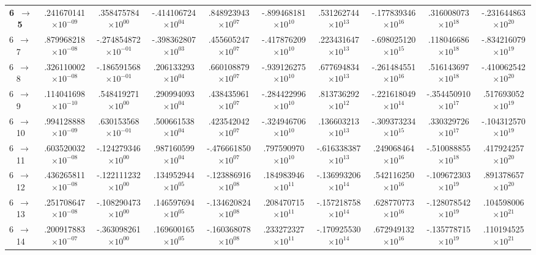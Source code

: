 \documentclass[reviewcopy]{elsarticle}
\begin{document}
\begin{landscape}
\begin{longtable}{lccccccccc}
{\bf 6~$\to$~ 5}  &  .241670141$\times10^{-09}$ &  .358475784$\times10^{00}$ & -.414106724$\times10^{04}$ &  .848923943$\times10^{07}$ & -.899468181$\times10^{10}$ &  .531262744$\times10^{13}$ & -.177839346$\times10^{16}$ &  .316008073$\times10^{18}$ & -.231644863$\times10^{20}$ \\
 6~$\to$~ 7  &  .879968218$\times10^{-08}$ & -.274854872$\times10^{-01}$ & -.398362807$\times10^{03}$ &  .455605247$\times10^{07}$ & -.417876209$\times10^{10}$ &  .223431647$\times10^{13}$ & -.698025120$\times10^{15}$ &  .118046686$\times10^{18}$ & -.834216079$\times10^{19}$ \\
 6~$\to$~ 8  &  .326110002$\times10^{-08}$ & -.186591568$\times10^{-01}$ &  .206133293$\times10^{04}$ &  .660108879$\times10^{07}$ & -.939126275$\times10^{10}$ &  .677694834$\times10^{13}$ & -.261484551$\times10^{16}$ &  .516143697$\times10^{18}$ & -.410062542$\times10^{20}$ \\
 6~$\to$~ 9  &  .114041698$\times10^{-10}$ &  .548419271$\times10^{00}$ &  .290994093$\times10^{04}$ &  .438435961$\times10^{07}$ & -.284422996$\times10^{10}$ &  .813736292$\times10^{12}$ & -.221618049$\times10^{14}$ & -.354450910$\times10^{17}$ &  .517693052$\times10^{19}$ \\
 6~$\to$~ 10 &  .994128888$\times10^{-09}$ &  .630153568$\times10^{-01}$ &  .500661538$\times10^{04}$ &  .423542042$\times10^{07}$ & -.324946706$\times10^{10}$ &  .136603213$\times10^{13}$ & -.309373234$\times10^{15}$ &  .330329726$\times10^{17}$ & -.104312570$\times10^{19}$ \\
 6~$\to$~ 11 &  .603520032$\times10^{-08}$ & -.124279346$\times10^{00}$ &  .987160599$\times10^{04}$ & -.476661850$\times10^{07}$ &  .797590970$\times10^{10}$ & -.616338387$\times10^{13}$ &  .249068464$\times10^{16}$ & -.510088855$\times10^{18}$ &  .417924257$\times10^{20}$ \\
 6~$\to$~ 12 &  .436265811$\times10^{-08}$ & -.122111232$\times10^{00}$ &  .134952944$\times10^{05}$ & -.123886916$\times10^{08}$ &  .184983946$\times10^{11}$ & -.136993206$\times10^{14}$ &  .542116250$\times10^{16}$ & -.109672303$\times10^{19}$ &  .891378657$\times10^{20}$ \\
 6~$\to$~ 13 &  .251708647$\times10^{-08}$ & -.108290473$\times10^{00}$ &  .146597694$\times10^{05}$ & -.134620824$\times10^{08}$ &  .208470715$\times10^{11}$ & -.157218758$\times10^{14}$ &  .628770773$\times10^{16}$ & -.128078542$\times10^{19}$ &  .104598006$\times10^{21}$ \\
 6~$\to$~ 14 &  .200917883$\times10^{-07}$ & -.363098261$\times10^{00}$ &  .169600165$\times10^{05}$ & -.160368078$\times10^{08}$ &  .233272327$\times10^{11}$ & -.170925530$\times10^{14}$ &  .672949132$\times10^{16}$ & -.135778715$\times10^{19}$ &  .110194525$\times10^{21}$ \\

\end{longtable}
\end{landscape}
\end{document}
